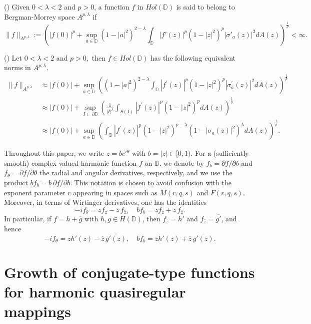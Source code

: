 \documentclass[12pt, reqno]{amsart}
\begin{document}
\begin{definition} {\rm (\cite{YL})
Given $0<\lambda< 2$ and $p>0$, a function $f$ in $Hol(\mathbb{D})$ is said to belong to Bergman-Morrey space $A^{p,\lambda}$ if
	$$\|f\|_{A^{p,\lambda}}:=\left(|f(0)|^p+	\sup\limits_{a\in\mathbb{D}} (1-|a|^{2})^{2-\lambda}\int_{\mathbb{D}}|f'(z)|^{p}(1-|z|^{2})^{p}|\sigma'_{a}(z)|^{2}dA(z)\right)^{\frac{1}{p}}<\infty.$$}
\end{definition}

\begin{lemma} {\rm (\cite[Remark 2.2]{YL})}
Let  $0<\lambda<2$  and  $p>0 ,$ then  $f \in Hol(\mathbb{D})$  has the following equivalent norms in  $A^{p, \lambda} .$
\begin{align*}
\|f\|_{A^{p, \lambda}} & \approx|f(0)|+\sup _{a \in \mathbb{D}}\left(\left(1-|a|^{2}\right)^{2-\lambda} \int_{\mathbb{D}}\left|f^{\prime}(z)\right|^{p}\left(1-|z|^{2}\right)^{p}\left|\sigma_{a}^{\prime}(z)\right|^{2} d A(z)\right)^{\frac{1}{p}} \\
& \approx|f(0)|+\sup _{I \subset \partial \mathbb{D}}\left(\frac{1}{|I|^{\lambda}} \int_{S(I)}\left|f^{\prime}(z)\right|^{p}\left(1-|z|^{2}\right)^{p} d A(z)\right)^{\frac{1}{p}} \\
& \approx|f(0)|+\sup _{a \in \mathbb{D}}\left(\int_{\mathbb{D}}\left|f^{\prime}(z)\right|^{p}\left(1-|z|^{2}\right)^{p-\lambda}\left(1-\left|\sigma_{a}(z)\right|^{2}\right)^{\lambda} d A(z)\right)^{\frac{1}{p}}.
\end{align*}
\end{lemma}

Throughout this paper, we write $z=b e^{i\theta}$ with $b=|z|\in[0,1)$.
For a (sufficiently smooth) complex-valued harmonic function $f$ on $\mathbb D$,
we denote by $f_b=\partial f/\partial b$ and $f_\theta=\partial f/\partial \theta$
the radial and angular derivatives, respectively, and we use the product $b f_b=b\,\partial f/\partial b$.
This notation is chosen to avoid confusion with the exponent parameter $r$ appearing in spaces such as $M(r,q,s)$ and $F(r,q,s)$.
Moreover, in terms of Wirtinger derivatives, one has the identities
\[
-i f_{\theta}=z f_{z}-\overline{z}\, f_{\bar z},\quad
b f_{b}=z f_{z}+\overline{z}\, f_{\bar z}.
\]
In particular, if $f=h+\overline g$ with $h,g\in H(\mathbb D)$, then $f_z=h'$ and $f_{\bar z}=\overline{g'}$, and hence
\[
-i f_{\theta}=z h'(z)-\overline{z}\,\overline{g'(z)},\quad
b f_{b}=z h'(z)+\overline{z}\,\overline{g'(z)}.
\]



\section{Growth of conjugate-type functions for harmonic quasiregular mappings}\label{section2}
\end{document}
